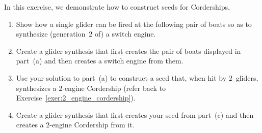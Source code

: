 \begin{multicols}{2}
\mfilbreak


\begin{problem}\label{exer:2_engine_corder_seed}
	In this exercise, we demonstrate how to construct seeds for Corderships.
	\begin{enumerate}[label=\bf\color{ocre}(\alph*)]
		\item Show how a single glider can be fired at the following pair of boats so as to synthesize (generation~$2$ of) a switch engine.
		\begin{center}
		\end{center}
		
		
		\item Create a glider synthesis that first creates the pair of boats displayed in part~(a) and then creates a switch engine from them.
		
		\item Use your solution to part~(a) to construct a seed that, when hit by $2$~gliders, synthesizes a $2$-engine Cordership (refer back to Exercise~\ref{exer:2_engine_cordership}).
		
		\item Create a glider synthesis that first creates your seed from part~(c) and then creates a $2$-engine Cordership from it.
	\end{enumerate}
\end{problem}




\end{multicols}
\normalsize\vspace*{0.01cm}
